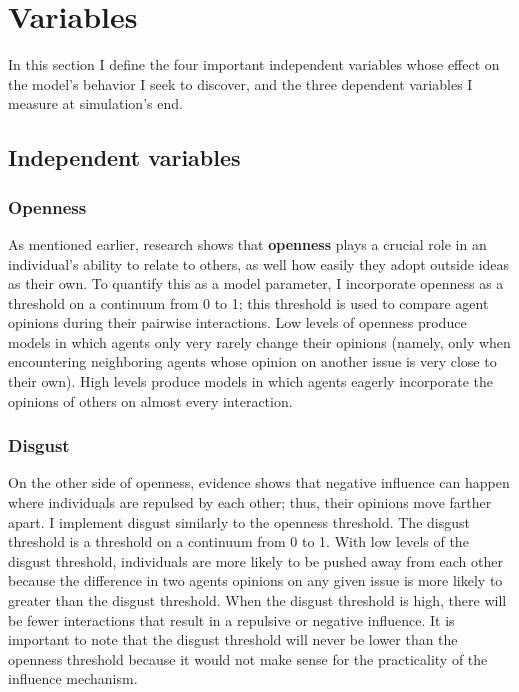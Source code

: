 
\section{Variables}

In this section I define the four important independent variables whose effect
on the model's behavior I seek to discover, and the three dependent variables I
measure at simulation's end.

\subsection{Independent variables}

\subsubsection{Openness}

As mentioned earlier, research shows that \textbf{openness} plays a crucial role in an
individual's ability to relate to others, as well how easily they adopt outside
ideas as their own. To quantify this as a model parameter, I incorporate
openness as a threshold on a continuum from 0 to 1; this threshold is used to
compare agent opinions during their pairwise interactions. Low levels of
openness produce models in which agents only very rarely change their opinions
(namely, only when encountering neighboring agents whose opinion on another
issue is very close to their own). High levels produce models in which agents
eagerly incorporate the opinions of others on almost every interaction.

\subsubsection{Disgust}

On the other side of openness, evidence\cite{cholvy_diffusion_2016} shows that negative influence can happen where individuals are repulsed by each other; thus, their opinions move farther apart. I implement disgust similarly to the openness threshold. The disgust threshold is a threshold on a continuum from 0 to 1. With low levels of the disgust threshold, individuals are more likely to be pushed away from each other because the difference in two agents opinions on any given issue is more likely to greater than the disgust threshold. When the disgust threshold is high, there will be fewer interactions that result in a repulsive or negative influence. It is important to note that the disgust threshold will never be lower than the openness threshold because it would not make sense for the practicality of the influence mechanism.   

